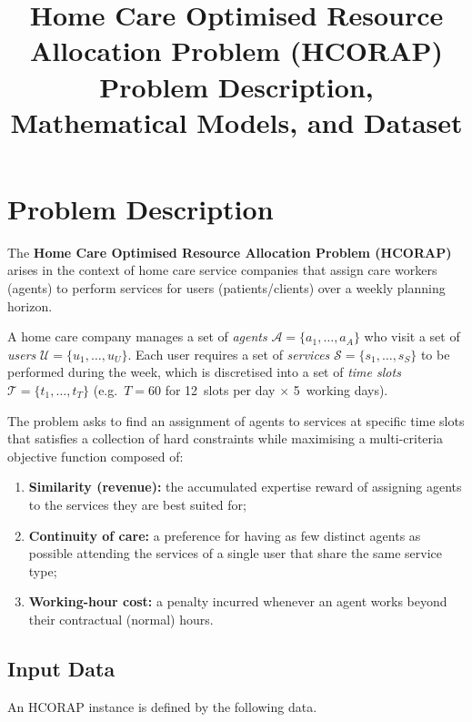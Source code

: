 \documentclass[11pt,a4paper]{article}
\title{\textbf{Home Care Optimised Resource Allocation Problem (HCORAP)}\\[6pt]
\large Problem Description, Mathematical Models, and Dataset}
\author{}
\date{}
\newcommand{\setA}{\mathcal{A}}
\newcommand{\setU}{\mathcal{U}}
\newcommand{\setS}{\mathcal{S}}
\newcommand{\setT}{\mathcal{T}}
\begin{document}
\maketitle


\section{Problem Description}\label{sec:problem}

The \textbf{Home Care Optimised Resource Allocation Problem (HCORAP)} arises in
the context of home care service companies that assign care workers (agents) to
perform services for users (patients/clients) over a weekly planning horizon.

A home care company manages a set of \emph{agents} $\setA = \{a_1, \ldots, a_A\}$
who visit a set of \emph{users} $\setU = \{u_1, \ldots, u_U\}$.
Each user requires a set of \emph{services}
$\setS = \{s_1, \ldots, s_S\}$ to be performed during the week,
which is discretised into a set of \emph{time slots}
$\setT = \{t_1, \ldots, t_{T}\}$ (e.g.\ $T = 60$ for 12~slots per day
$\times$ 5~working days).

The problem asks to find an assignment of agents to services at specific time slots
that satisfies a collection of hard constraints while maximising a multi-criteria
objective function composed of:
\begin{enumerate}[label=(\roman*)]
    \item \textbf{Similarity (revenue):} the accumulated expertise reward of
          assigning agents to the services they are best suited for;
    \item \textbf{Continuity of care:} a preference for having as few distinct
          agents as possible attending the services of a single user that share
          the same service type;
    \item \textbf{Working-hour cost:} a penalty incurred whenever an agent works
          beyond their contractual (normal) hours.
\end{enumerate}

\subsection{Input Data}

An HCORAP instance is defined by the following data.
\end{document}
